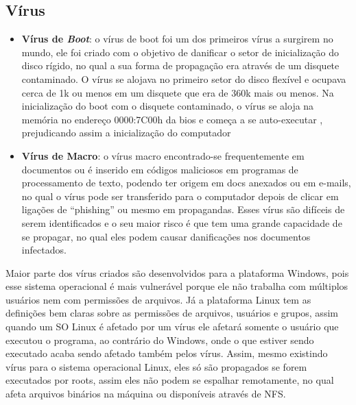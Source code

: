 \subsection{Vírus}

\begin{itemize}
  \item \textbf{Vírus de \textit{Boot}}: o vírus de boot foi um dos primeiros vírus a surgirem no mundo,
    ele foi criado com o objetivo de danificar o setor de inicialização do disco rígido,
    no qual a sua forma de propagação era através de um disquete contaminado. O vírus se
    alojava no primeiro setor do disco flexível e ocupava cerca de 1k ou menos em um
    disquete que era de 360k mais ou menos. Na inicialização do boot com o disquete
    contaminado, o vírus se aloja na memória no endereço 0000:7C00h da bios e começa
    a se auto-executar , prejudicando assim a inicialização do computador

  \item \textbf{Vírus de Macro}: o vírus macro encontrado-se frequentemente em documentos ou é
    inserido em códigos maliciosos em programas de processamento de texto, podendo ter
    origem em docs anexados ou em e-mails, no qual o vírus pode ser transferido para o
    computador depois de clicar em ligações de “phishing” ou mesmo em propagandas. Esses
    vírus são difíceis de serem identificados e o seu maior risco é que tem uma grande
    capacidade de se propagar, no qual eles podem causar danificações nos documentos infectados.
\end{itemize}

Maior parte dos vírus criados são desenvolvidos para a plataforma Windows, pois esse sistema operacional
é mais vulnerável porque ele não trabalha com múltiplos usuários nem com permissões de arquivos. Já a plataforma
Linux tem as definições bem claras sobre as permissões de arquivos, usuários e grupos, assim quando um SO Linux é
afetado por um vírus ele afetará somente o usuário que executou o programa, ao contrário do Windows, onde o que estiver
sendo executado acaba sendo afetado também pelos vírus. Assim, mesmo existindo vírus para o sistema operacional Linux, eles
só são propagados se forem executados por roots, assim eles não podem se espalhar remotamente, no qual afeta arquivos binários
na máquina ou disponíveis através de NFS.

\lstset{style=shell}


